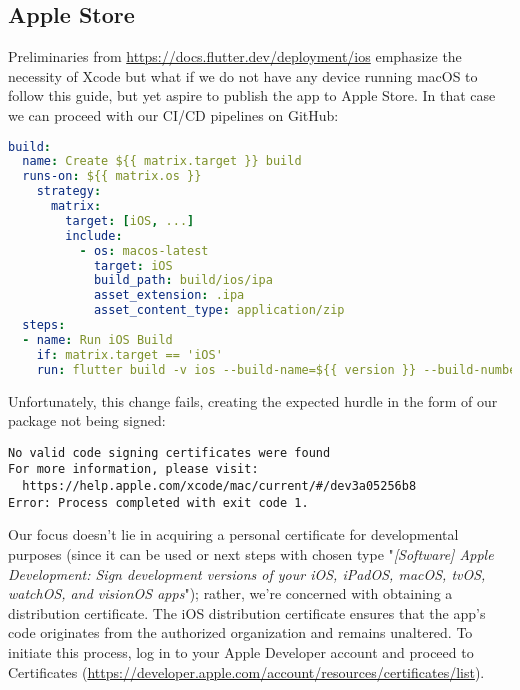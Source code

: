 
\subsection{Apple Store}

Preliminaries from \href{https://docs.flutter.dev/deployment/ios}{https://docs.flutter.dev/deployment/ios} emphasize 
the necessity of Xcode but what if we do not have any device running macOS to follow this guide, but yet aspire to 
publish the app to Apple Store. In that case we can proceed with our CI/CD pipelines on GitHub:

\begin{lstlisting}[language=yaml]
build:
  name: Create ${{ matrix.target }} build
  runs-on: ${{ matrix.os }}
    strategy:
      matrix:
        target: [iOS, ...]
        include:
          - os: macos-latest
            target: iOS
            build_path: build/ios/ipa
            asset_extension: .ipa
            asset_content_type: application/zip
  steps:
  - name: Run iOS Build
    if: matrix.target == 'iOS'
    run: flutter build -v ios --build-name=${{ version }} --build-number=${{ number }} --release --no-tree-shake-icons
\end{lstlisting}

\noindent Unfortunately, this change fails, creating the expected hurdle in the form of our package not being signed:

\begin{lstlisting}[language=terminal]
No valid code signing certificates were found
For more information, please visit:
  https://help.apple.com/xcode/mac/current/#/dev3a05256b8
Error: Process completed with exit code 1.
\end{lstlisting}

Our focus doesn't lie in acquiring a personal certificate for developmental purposes (since it can be used 
 or next steps with chosen type "\emph{[Software] Apple Development: Sign 
development versions of your iOS, iPadOS, macOS, tvOS, watchOS, and visionOS apps}"); rather, we're concerned with 
obtaining a distribution certificate. The iOS distribution certificate ensures that the app's code originates from the 
authorized organization and remains unaltered. To initiate this process, log in to your Apple Developer account and 
proceed to Certificates
(\href{https://developer.apple.com/account/resources/certificates/list}{https://developer.apple.com/account/resources/certificates/list}).


